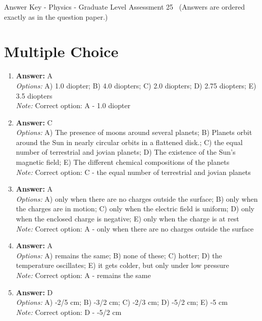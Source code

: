\documentclass[12pt]{article}
\begin{document}
\begin{center}
Answer Key - Physics - Graduate Level Assessment 25 \
\small (Answers are ordered exactly as in the question paper.)
\end{center}

\section*{Multiple Choice}
\begin{enumerate}[label=\arabic*.]
\item \textbf{Answer:} A
\\ \textit{Options:} A) 1.0 diopter; B) 4.0 diopters; C) 2.0 diopters; D) 2.75 diopters; E) 3.5 diopters
\\ \textit{Note:} Correct option: A - 1.0 diopter
\item \textbf{Answer:} C
\\ \textit{Options:} A) The presence of moons around several planets; B) Planets orbit around the Sun in nearly circular orbits in a flattened disk.; C) the equal number of terrestrial and jovian planets; D) The existence of the Sun's magnetic field; E) The different chemical compositions of the planets
\\ \textit{Note:} Correct option: C - the equal number of terrestrial and jovian planets
\item \textbf{Answer:} A
\\ \textit{Options:} A) only when there are no charges outside the surface; B) only when the charges are in motion; C) only when the electric field is uniform; D) only when the enclosed charge is negative; E) only when the charge is at rest
\\ \textit{Note:} Correct option: A - only when there are no charges outside the surface
\item \textbf{Answer:} A
\\ \textit{Options:} A) remains the same; B) none of these; C) hotter; D) the temperature oscillates; E) it gets colder, but only under low pressure
\\ \textit{Note:} Correct option: A - remains the same
\item \textbf{Answer:} D
\\ \textit{Options:} A) -2/5 cm; B) -3/2 cm; C) -2/3 cm; D) -5/2 cm; E) -5 cm
\\ \textit{Note:} Correct option: D - -5/2 cm
\end{enumerate}
\end{document}
